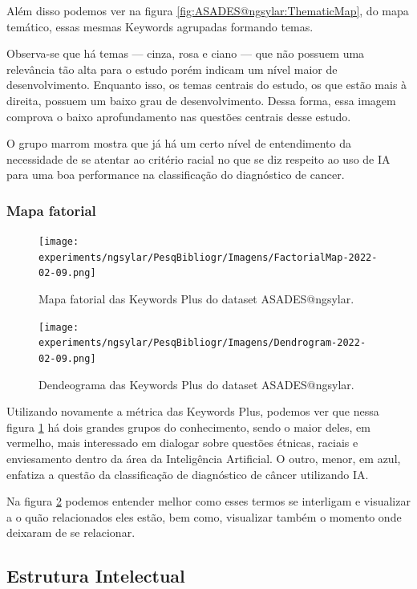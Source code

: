Além disso podemos ver na figura \ref{fig:ASADES@ngsylar:ThematicMap}, do mapa temático, essas mesmas Keywords agrupadas formando temas. 

Observa-se que há temas --- cinza, rosa e ciano --- que não possuem uma relevância tão alta para o estudo porém indicam um nível maior de desenvolvimento. Enquanto isso, os temas centrais do estudo, os que estão mais à direita, possuem um baixo grau de desenvolvimento. Dessa forma, essa imagem comprova o baixo aprofundamento nas questões centrais desse estudo.

O grupo marrom mostra que já há um certo nível de entendimento da necessidade de se atentar ao critério racial no que se diz respeito ao uso de IA para uma boa performance na classificação do diagnóstico de cancer. 

\subsubsection{Mapa fatorial}
\begin{figure}[H]
    \centering
\texttt{[image: experiments/ngsylar/PesqBibliogr/Imagens/FactorialMap-2022-02-09.png]}
    \caption{Mapa fatorial das Keywords Plus do dataset ASADES@ngsylar.}
    \label{fig:ASADES@ngsylar:FactorialMap}
\end{figure}

\begin{figure}[H]
    \centering
\texttt{[image: experiments/ngsylar/PesqBibliogr/Imagens/Dendrogram-2022-02-09.png]}
    \caption{Dendeograma das Keywords Plus do dataset ASADES@ngsylar.}
    \label{fig:ASADES@ngsylar:Dendeogram}
\end{figure}


Utilizando novamente a métrica das Keywords Plus, podemos ver que nessa figura \ref{fig:ASADES@ngsylar:FactorialMap} há dois grandes grupos do conhecimento, sendo o maior deles, em vermelho, mais interessado em dialogar sobre questões étnicas, raciais e enviesamento dentro da área da Inteligência Artificial. O outro, menor, em azul, enfatiza a questão da classificação de diagnóstico de câncer utilizando IA. 

Na figura \ref{fig:ASADES@ngsylar:Dendeogram} podemos entender melhor como esses termos se interligam e visualizar a o quão relacionados eles estão, bem como, visualizar também o momento onde deixaram de se relacionar.


\subsection{Estrutura Intelectual}


